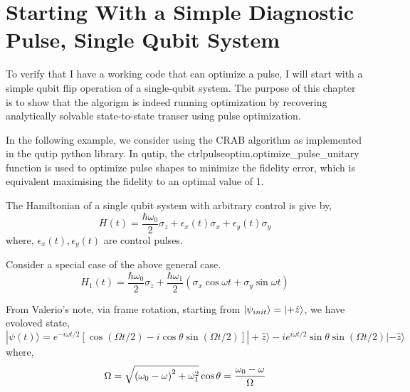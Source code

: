 \documentclass[12pt]{report}
\begin{document}
\section{Starting With a Simple Diagnostic Pulse, Single Qubit System}
To verify that I have a working code that can optimize a pulse, 
I will start with a simple qubit flip operation of a single-qubit system.
The purpose of this chapter is to show that the algorigm is indeed running optimization
by recovering analytically solvable state-to-state transer using pulse optimization. 
\par
In the following example, we consider using the CRAB algorithm as implemented in the 
qutip python library. In qutip, the ctrlpulseoptim.optimize\_pulse\_unitary function is used 
to optimize pulse shapes to minimize the fidelity error, which is equivalent maximising the fidelity to an optimal value of 1.
\par
The Hamiltonian of a single qubit system with arbitrary control is give by, 
\begin{equation}
    H(t) = \frac{\hbar \omega_0}{2} \sigma_z + \epsilon_x(t)\sigma_x + \epsilon_y(t)\sigma_y 
\end{equation}
where, $\epsilon_x(t), \epsilon_y(t)$ are control pulses.  
\par
Consider a special case of the above general case. 
\begin{equation}
    H_1(t) = \frac{\hbar \omega_0}{2} \sigma_z + \frac{\hbar \omega_1}{2}(\sigma_x\cos{\omega t} + \sigma_y\sin{\omega t})    
\end{equation}

From Valerio's note, via frame rotation, starting from $\ket{\psi_{init}} = \ket{+\hat{z}}$, 
we have evoloved state, 
\begin{equation}
    |\psi(t)\rangle=e^{-i \omega t / 2}[\cos (\Omega t / 2)-i \cos \theta \sin (\Omega t / 2)]|+\hat{z}\rangle-i e^{i \omega t / 2} \sin \theta \sin (\Omega t / 2)|-\hat{z}\rangle
\end{equation}
where, 
$$
\Omega=\sqrt{\left(\omega_0-\omega\right)^2+\omega_1^2} \\
\cos \theta=\frac{\omega_0-\omega}{\Omega}
$$
\end{document}
